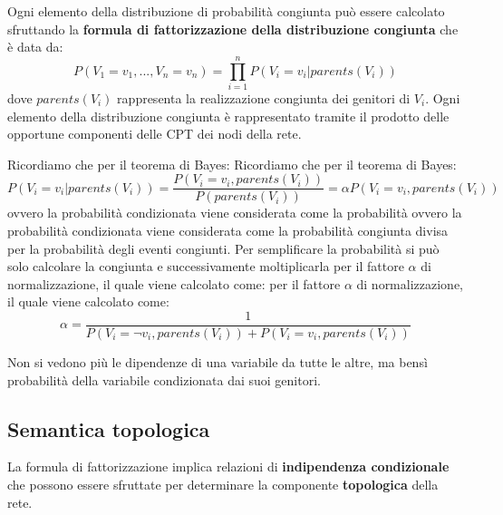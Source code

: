 Ogni elemento della distribuzione di probabilità congiunta può essere calcolato
sfruttando la \textbf{formula di fattorizzazione della distribuzione congiunta}
che è data da:
\begin{equation}
    P(V_1 = v_1,...,V_n = v_n) = \prod_{i=1}^{n} P(V_i=v_i|parents(V_i))
\end{equation}
dove $parents(V_i)$ rappresenta la realizzazione congiunta dei genitori di $V_i$.
Ogni elemento della distribuzione congiunta è rappresentato tramite il prodotto
delle opportune componenti delle CPT dei nodi della rete.
\begin{nota}
    Ricordiamo che per il teorema di Bayes:
    Ricordiamo che per il teorema di Bayes:
    \begin{equation*}
        P(V_i = v_i|parents(V_i)) = \frac{P(V_i = v_i,parents(V_i))}{P(parents(V_i))}
        = \alpha P(V_i = v_i,parents(V_i))
    \end{equation*}
    ovvero la probabilità condizionata viene considerata come la probabilità
    ovvero la probabilità condizionata viene considerata come la probabilità
    congiunta divisa per la probabilità degli eventi congiunti. Per semplificare
    la probabilità si può solo calcolare la congiunta e successivamente moltiplicarla
    per il fattore $\alpha$ di normalizzazione, il quale viene calcolato come:
    per il fattore $\alpha$ di normalizzazione, il quale viene calcolato come:
    \begin{equation*}
        \alpha = \frac{1}{P(V_i = \lnot v_i, parents(V_i)) + P(V_i = v_i,parents(V_i))}
    \end{equation*}
\end{nota}
\begin{nota}
    Non si vedono più le dipendenze di una variabile da tutte le altre, ma bensì
    probabilità della variabile condizionata dai suoi genitori.
\end{nota}
\subsection{Semantica topologica}
La formula di fattorizzazione implica relazioni di \textbf{indipendenza condizionale}
che possono essere sfruttate per determinare la componente \textbf{topologica}
della rete.

